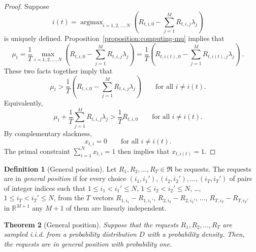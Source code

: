 \documentclass[12pt]{article}
\newcommand{\R}{\mathbb{R}}
\newcommand{\Requests}{\mathfrak{R}}
\DeclareMathOperator*{\argmax}{argmax}
\newtheorem{theorem}{Theorem}
\theoremstyle{definition}
\newtheorem{definition}[theorem]{Definition}
\begin{document}
\begin{proof}
Suppose
$$
i(t) = \argmax_{i=1,2,\dots,N} \left( R_{t,i,0} - \sum_{j=1}^M R_{t,i,j} \lambda_j \right)
$$
is uniquely defined. Proposition~\ref{proposition:computing-mu} implies that
$$
\mu_t = \frac{1}{T} \max_{i=1,2,\dots,N} \left( R_{t,i,0} - \sum_{j=1}^M R_{t,i,j} \lambda_j \right) = \frac{1}{T} \left( R_{t,i(t),0} - \sum_{j=1}^M R_{t,i(t),j} \lambda_j \right) \: .
$$
These two facts together imply that
$$
\mu_t > \frac{1}{T} \left( R_{t,i,0} - \sum_{j=1}^M R_{t,i,j} \lambda_j \right) \qquad \text{for all $i \neq i(t)$.}
$$
Equivalently,
$$
\mu_t + \frac{1}{T} \sum_{j=1}^M R_{t,i,j} \lambda_j > \frac{1}{T} R_{t,i,0} \qquad \text{for all $i \neq i(t)$.}
$$
By complementary slackness,
$$
x_{t,i} = 0 \qquad \text{for all $i \neq i(t)$}.
$$
The primal constraint $\sum_{i=1}^N x_{t,i} = 1$ then implies that $x_{t,i(t)} = 1$.
\end{proof}

\begin{definition}[General position]
\label{definition:general-position}
Let $R_1, R_2, \dots, R_T \in \Requests$ be requests. The requests are in
\emph{general position} if for every choice $(i_1,i_1'), (i_2,i_2'), \dots,
(i_T,i_T')$ of pairs of integer indices such that $1 \le i_1 < i_1' \le N$, $1
\le i_2 < i_2' \le N$, \dots, $1 \le i_T < i_T' \le N$, from the $T$ vectors
$R_{1,i_1} - R_{1,i_1'}$, $R_{2,i_2} - R_{2,i_2'}$, $\dots$, $R_{T,i_T} -
R_{T,i_T'}$ in $\R^{M+1}$ any $M+1$ of them are linearly independent.
\end{definition}

\begin{theorem}[General position]
\label{theorem:general-position}
Suppose that the requests $R_1, R_2, \dots, R_T$ are sampled i.i.d. from a
probability distribution $D$ with a probability density. Then, the requests are
in general position with probability one.
\end{theorem}
\end{document}
